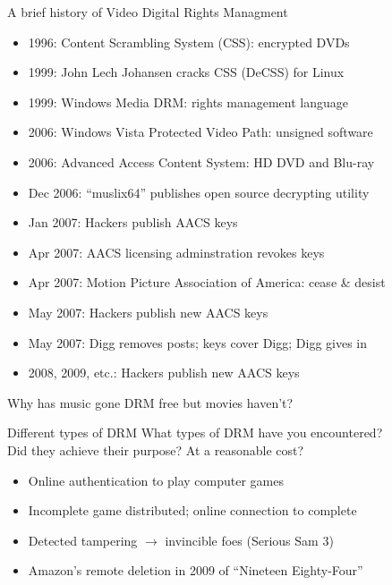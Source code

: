 \documentclass{beamer}
\begin{document}
\begin{frame}{A brief history of Video Digital Rights Managment}
\begin{itemize}
\item 1996: Content Scrambling System (CSS): encrypted DVDs
\item 1999: John Lech Johansen cracks CSS (DeCSS) for Linux
\item 1999: Windows Media DRM: rights management language
\item 2006: Windows Vista Protected Video Path: unsigned software
\item 2006: Advanced Access Content System: HD DVD and Blu-ray
\item Dec 2006: ``muslix64'' publishes open source decrypting utility
\item Jan 2007: Hackers publish AACS keys
\item Apr 2007: AACS licensing adminstration revokes keys
\item Apr 2007: Motion Picture Association of America: cease \& desist
\item May 2007: Hackers publish new AACS keys 
\item May 2007: Digg removes posts; keys cover Digg; Digg gives in
\item 2008, 2009, etc.: Hackers publish new AACS keys
\end{itemize}
\pause
\begin{center}
Why has music gone DRM free but movies haven't?
\end{center}
\end{frame}

\begin{frame}{Different types of DRM}
What types of DRM have you encountered? \\
\bigskip
Did they achieve their purpose? At a reasonable cost?\\
\bigskip
\pause
\begin{itemize}
\item Online authentication to play computer games
\item Incomplete game distributed; online connection to complete
\item Detected tampering $\rightarrow$ invincible foes (Serious Sam 3)
\item Amazon's remote deletion in 2009 of ``Nineteen Eighty-Four''
\end{itemize}
\end{frame}
\end{document}
